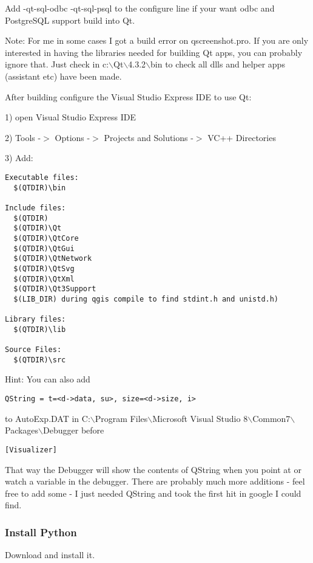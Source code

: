 Add -qt-sql-odbc -qt-sql-psql to the configure line if your want odbc and
PostgreSQL support build into Qt.

Note: For me in some cases I got a build error on qscreenshot.pro. If you
are only interested in having the libraries needed for building Qt apps, you 
can probably ignore that. Just check in c:$\backslash$Qt$\backslash$4.3.2$\backslash$bin to check all dlls and 
helper apps (assistant etc) have been made.

\hypertarget{toc100}{}
After building configure the Visual Studio Express IDE to use Qt:

1) open Visual Studio Express IDE

2) Tools -$>$ Options -$>$ Projects and Solutions -$>$ VC++ Directories

3) Add:

\begin{verbatim}
Executable files: 
  $(QTDIR)\bin

Include files: 
  $(QTDIR)
  $(QTDIR)\Qt
  $(QTDIR)\QtCore
  $(QTDIR)\QtGui
  $(QTDIR)\QtNetwork
  $(QTDIR)\QtSvg
  $(QTDIR)\QtXml
  $(QTDIR)\Qt3Support
  $(LIB_DIR) during qgis compile to find stdint.h and unistd.h)

Library files: 
  $(QTDIR)\lib

Source Files:
  $(QTDIR)\src
\end{verbatim}

Hint:  You can also add

\begin{verbatim}
QString = t=<d->data, su>, size=<d->size, i>
\end{verbatim}

to AutoExp.DAT in C:$\backslash$Program Files$\backslash$Microsoft Visual 
Studio 8$\backslash$Common7$\backslash$Packages$\backslash$Debugger before 

\begin{verbatim}
[Visualizer]
\end{verbatim}

That way the Debugger will show the contents of QString when you point at or
watch a variable in the debugger.  There are probably much more additions -
feel free to add some - I just needed QString and took the first hit in google
I could find.

\hypertarget{toc101}{}
\subsubsection{Install Python}
Download  and install it.

